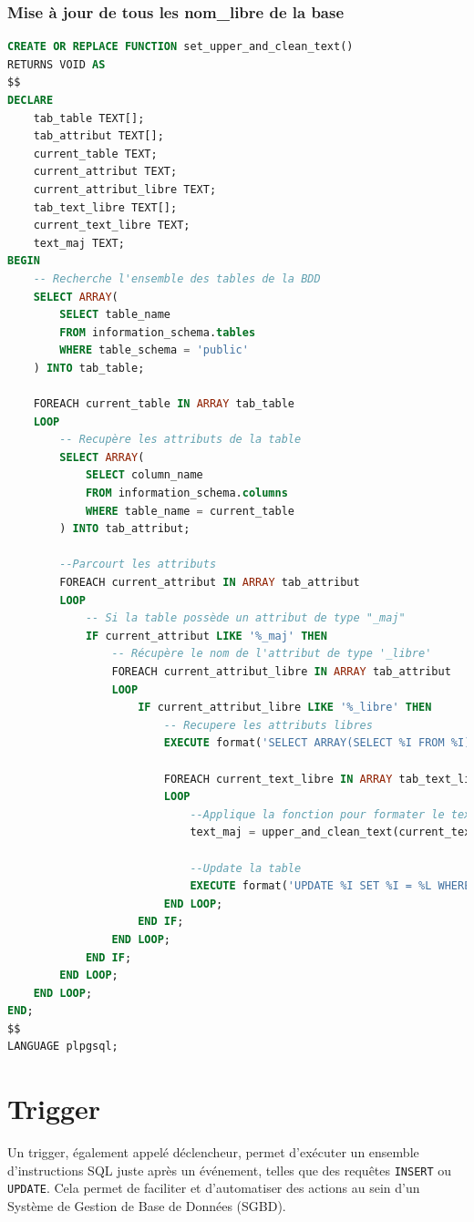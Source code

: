 \subsubsection{Mise à jour de tous les nom\_libre de la base}
\begin{lstlisting}[language=SQL]
CREATE OR REPLACE FUNCTION set_upper_and_clean_text()
RETURNS VOID AS
$$
DECLARE
    tab_table TEXT[];
    tab_attribut TEXT[];
    current_table TEXT;
    current_attribut TEXT;
    current_attribut_libre TEXT;
    tab_text_libre TEXT[];
	current_text_libre TEXT;
    text_maj TEXT;
BEGIN
    -- Recherche l'ensemble des tables de la BDD
    SELECT ARRAY(
        SELECT table_name
        FROM information_schema.tables
        WHERE table_schema = 'public'
    ) INTO tab_table;
    
    FOREACH current_table IN ARRAY tab_table
    LOOP
        -- Recupère les attributs de la table
        SELECT ARRAY(
            SELECT column_name
            FROM information_schema.columns
            WHERE table_name = current_table
        ) INTO tab_attribut;
		
		--Parcourt les attributs
        FOREACH current_attribut IN ARRAY tab_attribut
        LOOP
            -- Si la table possède un attribut de type "_maj"
            IF current_attribut LIKE '%_maj' THEN
                -- Récupère le nom de l'attribut de type '_libre'
                FOREACH current_attribut_libre IN ARRAY tab_attribut
                LOOP
                    IF current_attribut_libre LIKE '%_libre' THEN
                        -- Recupere les attributs libres
                        EXECUTE format('SELECT ARRAY(SELECT %I FROM %I)', current_attribut_libre, current_table) INTO tab_text_libre;
                        
						FOREACH current_text_libre IN ARRAY tab_text_libre
        				LOOP
							--Applique la fonction pour formater le texte
							text_maj = upper_and_clean_text(current_text_libre, TRUE);
							
							--Update la table
							EXECUTE format('UPDATE %I SET %I = %L WHERE %I = %L', current_table, current_attribut, text_maj, current_attribut_libre, current_text_libre);
						END LOOP;
                    END IF;
                END LOOP;
            END IF;
        END LOOP;
    END LOOP;
END;
$$
LANGUAGE plpgsql;
\end{lstlisting}

\section{Trigger}\label{trigger}
Un trigger, également appelé déclencheur, permet d’exécuter un ensemble d’instructions SQL juste après un événement, telles que des requêtes \texttt{INSERT} ou \texttt{UPDATE}. Cela permet de faciliter et d’automatiser des actions au sein d’un Système de Gestion de Base de Données (SGBD).

